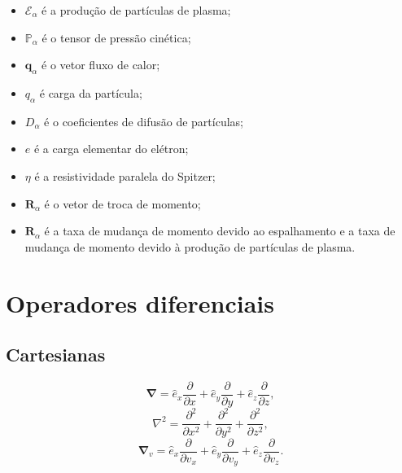 \documentclass[12pt,oneside,a4paper]{abntex2}
\begin{document}
\begin{itemize}
\item $\mathcal{E}_\alpha$ é a produção de partículas de plasma;
\item $\mathbb{P}_\alpha$ é o tensor de pressão cinética; %
\item $\bm{q}_\alpha $ é o vetor fluxo de calor; %
\item $q_\alpha$ é carga da partícula;
\item $D_\alpha$ é o coeficientes de difusão de partículas;
\item $e$ é a carga elementar do elétron;
\item $\eta$ é a resistividade paralela do Spitzer;
\item $\bm{R}_\alpha$ é o vetor de troca de momento;
\item $\bm{R}_\alpha$ é a taxa de mudança de momento devido ao espalhamento e a taxa de mudança de momento devido à produção de partículas de plasma.


\end{itemize}

\section*{Operadores diferenciais}
\subsection*{Cartesianas}
\begin{equation}
\bm{\nabla} = \hat{e}_x \frac{\partial}{\partial x} + \hat{e}_y \frac{\partial}{\partial y} + \hat{e}_z \frac{\partial}{\partial z},
\end{equation}
\begin{equation}
\nabla^2 =  \frac{\partial^2}{\partial x^2} +  \frac{\partial^2}{\partial y^2} + \frac{\partial^2}{\partial z^2},
\end{equation} %
\begin{equation}
\bm{\nabla}_v = \hat{e}_x \frac{\partial}{\partial v_x} + \hat{e}_y \frac{\partial}{\partial v_y} + \hat{e}_z \frac{\partial}{\partial v_z}.
\end{equation} 
\end{document}
